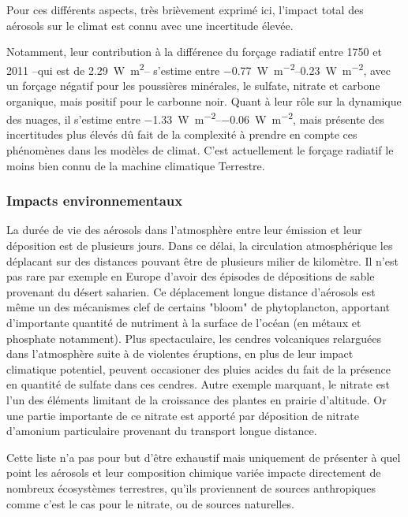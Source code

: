 Pour ces différents aspects, très brièvement exprimé ici, l'impact total des aérosols sur
le climat est connu avec une incertitude élevée. 

Notamment, leur contribution à la différence du forçage radiatif entre 1750 et 2011 --qui
est de \SI{2.29}{\W\m\squared}-- s'estime entre
\SIrange[range-phrase=~et~]{-0.77}{0.23}{\W\per\m\squared}, avec un forçage négatif pour
les poussières minérales, le sulfate, nitrate et carbone organique, mais positif pour le
carbonne noir.  Quant à leur rôle sur la dynamique des nuages, il s'estime entre
\SIrange[range-phrase=~et~]{-1.33}{-0.06}{\W\per\m\squared}, mais présente des
incertitudes plus élevés dû fait de la complexité à prendre en compte ces phénomènes dans
les modèles de climat. C'est actuellement le forçage radiatif le moins bien connu de la
machine climatique Terrestre.

\subsubsection{Impacts environnementaux}%
\label{ssub:impacts_environnementaux}

La durée de vie des aérosols dans l'atmosphère entre leur émission et leur déposition est
de plusieurs jours. Dans ce délai, la circulation atmosphérique les déplacant sur des
distances pouvant être de plusieurs milier de kilomètre. Il n'est pas rare par exemple en
Europe d'avoir des épisodes de dépositions de sable provenant du désert saharien. Ce
déplacement longue distance d'aérosols est même un des mécanismes clef de certains "bloom"
de phytoplancton, apportant d'importante quantité de nutriment à la surface de l'océan (en
métaux et phosphate notamment).
Plus spectaculaire, les cendres volcaniques relarguées dans l'atmosphère suite à de
violentes éruptions, en plus de leur impact climatique potentiel, peuvent occasioner des
pluies acides du fait de la présence en quantité de sulfate dans ces cendres.
Autre exemple marquant, le nitrate est l'un des éléments limitant de la croissance des
plantes en prairie d'altitude. Or une partie importante de ce nitrate est apporté par
déposition de nitrate d'amonium particulaire provenant du transport longue distance.

Cette liste n'a pas pour but d'être exhaustif mais uniquement de présenter à quel point
les aérosols et leur composition chimique variée impacte directement de nombreux
écosystèmes terrestres, qu'ils proviennent de sources anthropiques comme c'est le cas pour le
nitrate, ou de sources naturelles.

